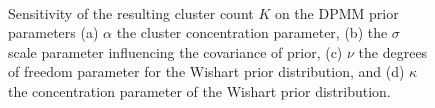 \begin{figure}[]
\centering
{}\quad
{}\quad \\
\quad
{}\quad
\caption{
    Sensitivity of the resulting cluster count $K$ on the DPMM prior parameters (a) $\alpha$ the cluster concentration parameter, (b) the $\sigma$ scale parameter influencing the covariance of prior, (c) $\nu$ the degrees of freedom parameter for the Wishart prior distribution, and (d) $\kappa$ the concentration parameter of the Wishart prior distribution.
}
\label{fig:hyp_cluster}
\end{figure}